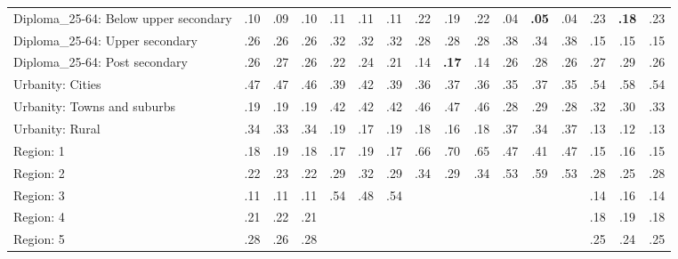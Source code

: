 \begin{tabular}[t]{lccccccccccccccc}
\addlinespace
Diploma\_25-64: Below upper secondary & .10 & .09 & .10 & .11 & .11 & .11 & .22 & .19 & .22 & .04 & \textbf{.05} & .04 & .23 & \textbf{.18} & .23\\
Diploma\_25-64: Upper secondary & .26 & .26 & .26 & .32 & .32 & .32 & .28 & .28 & .28 & .38 & .34 & .38 & .15 & .15 & .15\\
Diploma\_25-64: Post secondary & .26 & .27 & .26 & .22 & .24 & .21 & .14 & \textbf{.17} & .14 & .26 & .28 & .26 & .27 & .29 & .26\\
\addlinespace
Urbanity: Cities & .47 & .47 & .46 & .39 & .42 & .39 & .36 & .37 & .36 & .35 & .37 & .35 & .54 & .58 & .54\\
Urbanity: Towns and suburbs & .19 & .19 & .19 & .42 & .42 & .42 & .46 & .47 & .46 & .28 & .29 & .28 & .32 & .30 & .33\\
Urbanity: Rural & .34 & .33 & .34 & .19 & .17 & .19 & .18 & .16 & .18 & .37 & .34 & .37 & .13 & .12 & .13\\
\addlinespace
Region: 1 & .18 & .19 & .18 & .17 & .19 & .17 & .66 & .70 & .65 & .47 & .41 & .47 & .15 & .16 & .15\\
Region: 2 & .22 & .23 & .22 & .29 & .32 & .29 & .34 & .29 & .34 & .53 & .59 & .53 & .28 & .25 & .28\\
Region: 3 & .11 & .11 & .11 & .54 & .48 & .54 &  &  &  &  &  &  & .14 & .16 & .14\\
Region: 4 & .21 & .22 & .21 &  &  &  &  &  &  &  &  &  & .18 & .19 & .18\\
Region: 5 & .28 & .26 & .28 &  &  &  &  &  &  &  &  &  & .25 & .24 & .25\\
\bottomrule
\end{tabular}